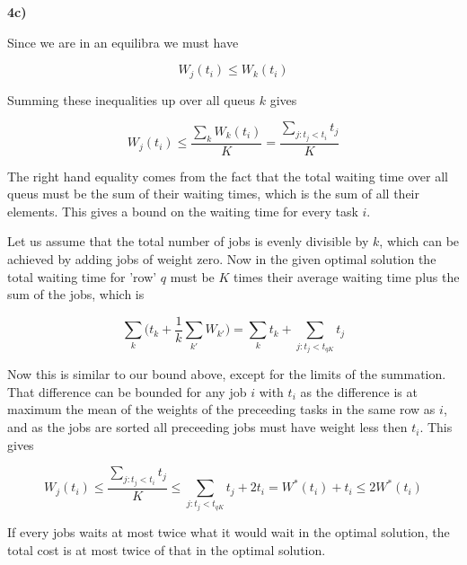 \textbf{4c)}

Since we are in an equilibra we must have

$$
W_j(t_i) \le W_k(t_i)
$$

Summing these inequalities up over all queus $k$ gives

$$
W_j(t_i) \le \frac{\sum_k W_k(t_i)}{K}  = \frac{\sum_{j: t_j < t_i}  t_j}{K} 
$$

The right hand equality comes from the fact that the total waiting time over all queus must be the sum of their waiting times, which is the sum of all their elements. This gives a bound on the waiting time for every task $i$. 

Let us assume that the total number of jobs is evenly divisible by $k$, which can be achieved by adding jobs of weight zero. Now in the given optimal solution the total waiting time for 'row' $q$ must be $K$ times their average waiting time plus the sum of the jobs, which is

$$
\sum_k \bigg( t_k + \frac{1}{k} \sum_{k'} W_{k'} \bigg) = \sum_k t_k +  \sum_{j: t_j < t_{qK}}  t_j 
$$

Now this is similar to our bound above, except for the limits of the summation. That difference can be bounded for any job $i$ with $t_i$ as the difference is at maximum the mean of the weights of the preceeding tasks in the same row as $i$, and as the jobs are sorted all preceeding jobs must have weight less then $t_i$. This gives 

$$
W_j(t_i) \le \frac{\sum_{j: t_j < t_i}  t_j}{K}  \le \sum_{j: t_j < t_{qK}}  t_j  +  2 t_i =  W^*(t_i) + t_i \le 2 W^*(t_i)
$$

If every jobs waits at most twice what it would wait in the optimal solution, the total cost is at most twice of that in the optimal solution.
